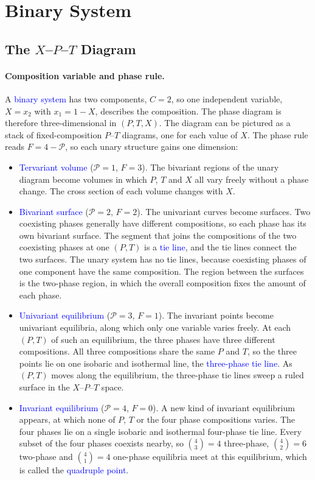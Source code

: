 \section{Binary System}

\subsection{The $X$--$P$--$T$ Diagram}

\paragraph{Composition variable and phase rule.}
A \textcolor{blue}{binary system} has two components, $C=2$, so one
independent variable, $X=x_2$ with $x_1=1-X$, describes the composition. The
phase diagram is therefore three-dimensional in $(P,T,X)$. The diagram can be
pictured as a stack of fixed-composition $P$--$T$ diagrams, one for each
value of $X$. The phase rule reads $F=4-\mathcal{P}$, so each unary
structure gains one dimension:
\begin{itemize}
    \item \textcolor{blue}{Tervariant volume} ($\mathcal{P}=1$, $F=3$). The
    bivariant regions of the unary diagram become volumes in which $P$, $T$
    and $X$ all vary freely without a phase change. The cross section of
    each volume changes with $X$.
    \item \textcolor{blue}{Bivariant surface} ($\mathcal{P}=2$, $F=2$). The
    univariant curves become surfaces. Two coexisting phases generally have
    different compositions, so each phase has its own bivariant surface.
    The segment that joins the compositions of the two coexisting phases at
    one $(P,T)$ is a \textcolor{blue}{tie line}, and the tie lines connect
    the two surfaces. The unary system has no tie lines, because coexisting
    phases of one component have the same composition. The region between
    the surfaces is the two-phase region, in which the overall composition
    fixes the amount of each phase.
    \item \textcolor{blue}{Univariant equilibrium} ($\mathcal{P}=3$,
    $F=1$). The invariant points become univariant equilibria, along which
    only one variable varies freely. At each $(P,T)$ of such an equilibrium,
    the three phases have three different compositions. All three
    compositions share the same $P$ and $T$, so the three points lie on one
    isobaric and isothermal line, the \textcolor{blue}{three-phase tie
    line}. As $(P,T)$ moves along the equilibrium, the three-phase tie lines
    sweep a ruled surface in the $X$--$P$--$T$ space.
    \item \textcolor{blue}{Invariant equilibrium} ($\mathcal{P}=4$, $F=0$).
    A new kind of invariant equilibrium appears, at which none of $P$, $T$
    or the four phase compositions varies. The four phases lie on a single
    isobaric and isothermal four-phase tie line. Every subset of the four phases
    coexists nearby, so $\binom{4}{3}=4$ three-phase, $\binom{4}{2}=6$
    two-phase and $\binom{4}{1}=4$ one-phase equilibria meet at this
    equilibrium, which is called the \textcolor{blue}{quadruple point}.
\end{itemize}

